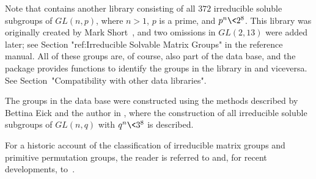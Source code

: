 Note that {\GAP} contains another library consisting of all $372$ irreducible soluble
subgroups of $GL(n, p)$, where $n > 1$, $p$ is a prime, and $p^n \< 2^8$. This library 
was originally
created by Mark Short~\cite{Sho}, and two omissions in $GL(2,13)$ were added later; 
see Section "ref:Irreducible Solvable Matrix Groups" in the {\GAP} reference manual.
All of these groups are,  of course, also part of the {\IRREDSOL} data base, and the
{\IRREDSOL} package provides functions to identify the groups in the
{\GAP} library in {\IRREDSOL} and viceversa. See
Section~"Compatibility with other data libraries".

The groups in the {\IRREDSOL} data base were constructed using the methods
described by Bettina Eick and the author in \cite{EH}, where the 
construction of all irreducible soluble subgroups of $GL(n, q)$ with $q^n \< 3^8$
is described.

For a historic account of the classification of irreducible matrix groups and
primitive permutation groups, the reader is referred to \cite{Sho} and, 
for recent developments, to~\cite{EH}.



